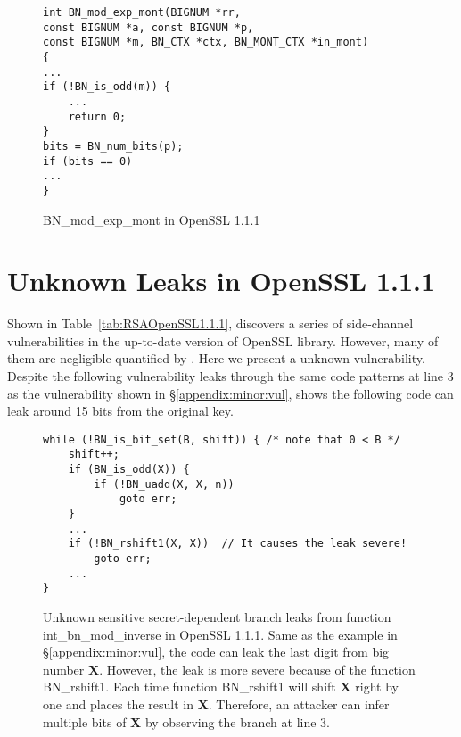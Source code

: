 \begin{figure}[h]
    \centering
    \begin{lstlisting}[xleftmargin=.02\textwidth,xrightmargin=.01\textwidth]
int BN_mod_exp_mont(BIGNUM *rr, 
const BIGNUM *a, const BIGNUM *p,
const BIGNUM *m, BN_CTX *ctx, BN_MONT_CTX *in_mont)
{
...
if (!BN_is_odd(m)) {
    ...
    return 0;
}
bits = BN_num_bits(p);
if (bits == 0) 
...
}

\end{lstlisting}
    \vspace*{-6pt}
    \caption{\textsf{BN\_mod\_exp\_mont} in OpenSSL 1.1.1}
    \label{appen:fig:exp_new}
    \vspace*{-6pt}
\end{figure}

\section{Unknown Leaks in OpenSSL 1.1.1}\label{unknown:leak}
Shown in Table~\ref{tab:RSAOpenSSL1.1.1}, \tool{} discovers a series
of side-channel vulnerabilities in the up-to-date version of OpenSSL library. 
However, many of them are negligible quantified by \tool{}.
Here we present a unknown vulnerability. Despite the following
vulnerability leaks through the same code patterns at line 3 as the vulnerability shown
in \S\ref{appendix:minor:vul}, \tool{} shows the following code can leak
around 15 bits from the original key.
\label{appendix:unknown}
\begin{figure}[h]
\centering
\begin{lstlisting}[xleftmargin=.02\textwidth,xrightmargin=.01\textwidth]
while (!BN_is_bit_set(B, shift)) { /* note that 0 < B */
    shift++;
    if (BN_is_odd(X)) {
        if (!BN_uadd(X, X, n))
            goto err;
    }
    ...
    if (!BN_rshift1(X, X))  // It causes the leak severe!
        goto err;
    ...
}
\end{lstlisting}
    \vspace*{-6pt}
    \caption{Unknown sensitive secret-dependent branch leaks from function 
             \textsf{int\_bn\_mod\_inverse} in OpenSSL 1.1.1. Same as the example
             in \S\ref{appendix:minor:vul}, the code can leak the last digit from
             big number \textbf{X}. However, the leak is more severe because of the 
             function \textsf{BN\_rshift1}. Each time function \textsf{BN\_rshift1}
             will shift \textbf{X} right by one and places the result in \textbf{X}. Therefore,
             an attacker can infer multiple bits of \textbf{X} by observing the branch at line 3.}
    \label{fig:unknown}
    \vspace*{-6pt}
\end{figure}



